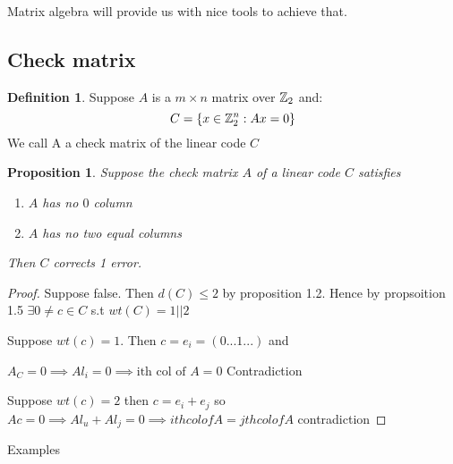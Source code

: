 \documentclass[]{article}
\newtheorem{prop}[thm]{Proposition}
\theoremstyle{definition}
\newtheorem*{defn}{Definition}
\theoremstyle{remark}
\numberwithin{equation}{section}
\begin{document}
		Matrix algebra will provide us with nice tools to achieve that.
	\subsection{Check matrix}

		\begin{defn}
		Suppose \(A\) is a \(m \times n\) matrix over \(\mathbb{Z}_2\) and:
		\begin{equation*}
		C = \{ x \in \mathbb{Z}_2^n : Ax = 0\}
		\end{equation*}
		We call A a check matrix of the linear code $C$
		\end{defn}

		\begin{prop}
		Suppose the check matrix $A$ of a linear code $C$ satisfies

		\begin{enumerate}
			\item $A$ has no $0$ column
			\item $A$ has no two equal columns
		\end{enumerate}
		Then $C$ corrects 1 error.
		\end{prop}

		\begin{proof}
		Suppose false. Then $d(C) \leq 2$ by proposition 1.2.
		Hence by propsoition 1.5 $\exists 0\neq c \in C$ s.t $wt(C) = 1 || 2$

		Suppose $wt(c) = 1$. Then $c = e_i = (0 ... 1 ...)$ and

		$A_C = 0 \implies Al_i = 0 \implies \text{ith col of $A$} = 0$ Contradiction

		Suppose $wt(c) = 2$ then $c = e_i + e_j$ so
		$Ac = 0 \implies Al_u + Al_j = 0 \implies ith col of A = jth col of A$ contradiction
		\end{proof}

		Examples
\end{document}
